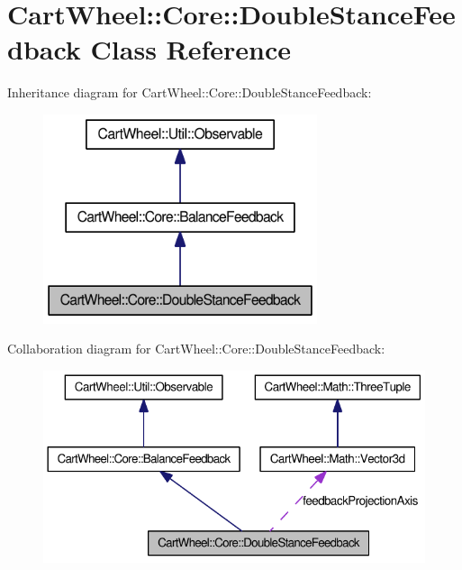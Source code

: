 \hypertarget{classCartWheel_1_1Core_1_1DoubleStanceFeedback}{
\section{CartWheel::Core::DoubleStanceFeedback Class Reference}
\label{classCartWheel_1_1Core_1_1DoubleStanceFeedback}
}


Inheritance diagram for CartWheel::Core::DoubleStanceFeedback:\nopagebreak
\begin{figure}[H]
\begin{center}
\leavevmode
\includegraphics[width=228pt]{classCartWheel_1_1Core_1_1DoubleStanceFeedback__inherit__graph}
\end{center}
\end{figure}


Collaboration diagram for CartWheel::Core::DoubleStanceFeedback:\nopagebreak
\begin{figure}[H]
\begin{center}
\leavevmode
\includegraphics[width=355pt]{classCartWheel_1_1Core_1_1DoubleStanceFeedback__coll__graph}
\end{center}
\end{figure}
